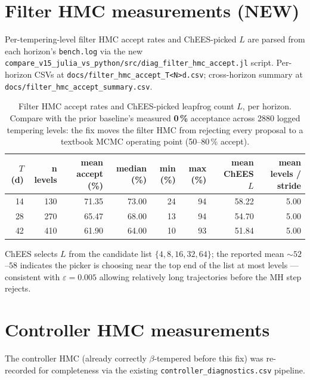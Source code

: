 \documentclass[11pt,a4paper]{article}
\begin{document}
\section{Filter HMC measurements (NEW)}
\label{sec:filter_hmc}

Per-tempering-level filter HMC accept rates and ChEES-picked $L$ are
parsed from each horizon's \texttt{bench.log} via the new
\texttt{compare\_v15\_julia\_vs\_python/src/diag\_filter\_hmc\_accept.jl}
script. Per-horizon CSVs at
\texttt{docs/filter\_hmc\_accept\_T<N>d.csv}; cross-horizon summary
at \texttt{docs/filter\_hmc\_accept\_summary.csv}.

\begin{table}[ht]
\centering
\small
\begin{tabular}{rrrrrrrr}
\toprule
$T$ (d) & n levels & mean accept (\%) & median (\%) & min (\%) &
max (\%) & mean ChEES $L$ & mean levels / stride \\
\midrule
14 & 130 & 71.35 & 73.00 & 24 & 94 & 58.22 & 5.00 \\
28 & 270 & 65.47 & 68.00 & 13 & 94 & 54.70 & 5.00 \\
42 & 410 & 61.90 & 64.00 & 10 & 93 & 51.84 & 5.00 \\
\bottomrule
\end{tabular}
\caption{Filter HMC accept rates and ChEES-picked leapfrog count $L$,
per horizon. Compare with the prior baseline's measured
\textbf{0\,\%} acceptance across 2880 logged tempering levels: the
fix moves the filter HMC from rejecting every proposal to a
textbook MCMC operating point (50--80\,\% accept).}
\label{tab:filter_hmc}
\end{table}

\noindent
ChEES selects $L$ from the candidate list $\{4, 8, 16, 32, 64\}$;
the reported mean $\sim 52$--$58$ indicates the picker is choosing
near the top end of the list at most levels --- consistent with
$\varepsilon = 0.005$ allowing relatively long trajectories before
the MH step rejects.


\section{Controller HMC measurements}
\label{sec:ctrl_hmc}

The controller HMC (already correctly $\beta$-tempered before this
fix) was re-recorded for completeness via the existing
\texttt{controller\_diagnostics.csv} pipeline.
\end{document}
